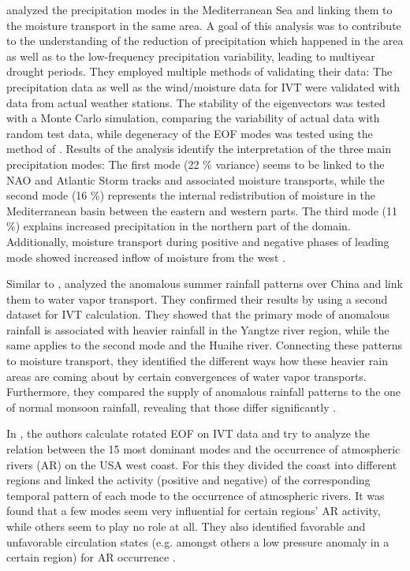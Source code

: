  


\citeauthor{fernandez_analysis_2003} analyzed the precipitation modes in the Mediterranean Sea and linking them to the moisture transport in the same area. 
A goal of this analysis was to contribute to the understanding of the reduction of precipitation which happened in the area as well as to the low-frequency precipitation variability, leading to multiyear drought periods.
They employed multiple methods of validating their data: The precipitation data as well as the wind/moisture data for IVT were validated with data from actual weather stations. 
The stability of the eigenvectors was tested with a Monte Carlo simulation, comparing the variability of actual data with random test data, while degeneracy of the EOF modes was tested using the method of \citeauthor{north_sampling_1982} \cite{north_sampling_1982}. 
Results of the analysis identify the interpretation of the three main precipitation modes:
The first mode (22 \% variance) seems to be linked to the NAO and Atlantic Storm tracks and associated moisture transports, while the second mode (16 \%) represents the internal redistribution of moisture in the Mediterranean basin between the eastern and western parts.  
The third mode (11 \%) explains increased precipitation in the northern part of the domain. 
Additionally, moisture transport during positive and negative phases of leading mode showed increased inflow of moisture from the west \cite{fernandez_analysis_2003}. 



Similar to \cite{fernandez_analysis_2003}, \citeauthor{zhou_atmospheric_2005} analyzed the anomalous summer rainfall patterns over China and link them to water vapor transport. 
They confirmed their results by using a second dataset for IVT calculation. 
They showed that the primary mode of anomalous rainfall is associated with heavier rainfall in the Yangtze river region, while the same applies to the second mode and the Huaihe river. 
Connecting these patterns to moisture transport, they identified the different ways how these heavier rain areas are coming about by certain convergences of water vapor transports. 
Furthermore, they compared the supply of anomalous rainfall patterns to the one of normal monsoon rainfall, revealing that those differ significantly \cite{zhou_atmospheric_2005}.


In \cite{guirguis_circulation_2018}, the authors calculate rotated EOF on IVT data and try to analyze the relation between the 15 most dominant modes and the occurrence of atmospheric rivers (AR) on the USA west coast. 
For this they divided the coast into different regions and linked the activity (positive and negative) of the corresponding temporal pattern of each mode to the occurrence of atmospheric rivers. 
It was found that a few modes seem very influential for certain regions' AR activity, while others seem to play no role at all. 
They also identified favorable and unfavorable circulation states (e.g. amongst others a low pressure anomaly in a certain region) for AR occurrence \cite{guirguis_circulation_2018}. 


